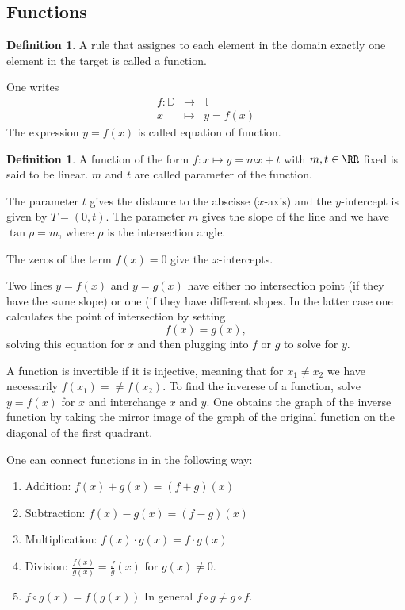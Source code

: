 \documentclass{article}
\theoremstyle{plain}
\theoremstyle{remark}
\theoremstyle{definition}
\newtheorem{defi}[theo]{Definition}
\begin{document}
\subsection*{Functions}
\begin{defi} A rule that assignes to each element in the domain exactly one element in the target is called a function.\end{defi}
One writes 
\begin{eqnarray*} f: \mathbb{D} &\rightarrow & \mathbb{T}\\ x &\mapsto& y=f(x)\end{eqnarray*}
The expression $y=f(x)$ is called equation of function. 
\begin{defi} A function of the form $f:x\mapsto y=mx+t$ with $m,t\in\RR$ fixed is said to be linear. $m$ and $t$ are called parameter of the function.\end{defi}
The parameter $t$ gives the distance to the abscisse ($x$-axis) and the $y$-intercept is given by $T=(0,t)$. The parameter $m$ gives the slope of the line and we have $\tan\rho=m$, where $\rho$ is the intersection angle. 

The zeros of the term $f(x)=0$ give the $x$-intercepts. 

Two lines $y=f(x)$ and $y=g(x)$ have either no intersection point (if they have the same slope) or one (if they have different slopes. In the latter case one calculates the point of intersection by setting
$$f(x)=g(x),$$
solving this equation for $x$ and then plugging into $f$ or $g$ to solve for $y$. 

A function is invertible if it is injective, meaning that for $x_1\neq x_2$ we have necessarily $f(x_1)=\neq f(x_2)$. To find the inverese of a function, solve $y=f(x)$ for $x$ and interchange $x$ and $y$. One obtains the graph of the inverse function by taking the mirror image of the graph of the original function on the diagonal of the first quadrant. 

One can connect functions in in the following way:
\begin{enumerate} \item Addition: $f(x)+g(x)= (f+g)(x)$
\item Subtraction: $f(x)-g(x)=(f-g)(x)$
\item Multiplication: $f(x)\cdot g(x)= f\cdot g(x)$
\item Division: $\frac{f(x)}{g(x)}=\frac{f}{g}(x)$ for $g(x)\neq 0$. 
\item $f\circ g(x)=f(g(x))$ In general $f\circ g\neq g\circ f$.
\end{enumerate}
\end{document}
